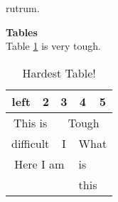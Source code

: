 \documentclass{article}
\begin{document}
rutrum.
\vspace{2mm}\\
\raggedright
\large \textbf{Tables}\\
\vspace{2mm}
Table \ref{tab:1} is very tough.

\begin{table}[!h]
    \centering
    \begin{tabular}{|c|c|c|c|c|} \hline
         left & 2 & 3 & 4 & 5 \\ \hline
         \multicolumn{2}{c}{This is} & \multicolumn{3}{c}{Tough} \\ \cline{3-5}
         \multicolumn{2}{c}{difficult} & I & \multicolumn{2}{c|}{What} \\ \cline{1-3}
         \multicolumn{3}{|c|}{Here I am} & \multicolumn{2}{l|}{is} \\
         \hline
         \multicolumn{3}{c}{} & \multicolumn{2}{l}{this} \\
    \end{tabular}
    \caption{Hardest Table!}
    \label{tab:1}
\end{table}
\end{document}
